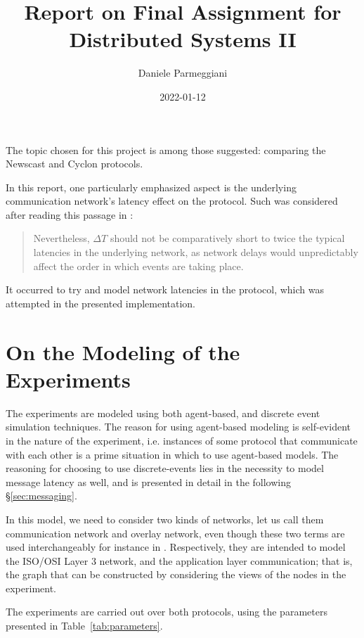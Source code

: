 \documentclass[a4paper]{ifacconf}
\newcommand{\DT}{\ensuremath{{\Delta}T}}
\begin{document}
\begin{frontmatter}
	\title{Report on Final Assignment for Distributed Systems II}
	\author{Daniele Parmeggiani}
	\date{2022-01-12}
\end{frontmatter}

The topic chosen for this project is among those suggested: comparing the Newscast and Cyclon protocols.

In this report, one particularly emphasized aspect is the underlying communication network's latency effect on the protocol.
Such was considered after reading this passage in \cite[\S3.2]{cyclon}:
\begin{quote}
    Nevertheless, $\DT$ should not be comparatively short to twice the typical latencies in the underlying network, as network delays would unpredictably affect the order in which events are taking place.
\end{quote}

It occurred to try and model network latencies in the protocol, which was attempted in the presented implementation.

\section{On the Modeling of the Experiments}

The experiments are modeled using both agent-based, and discrete event simulation techniques.
The reason for using agent-based modeling is self-evident in the nature of the experiment, i.e. instances of some protocol that communicate with each other is a prime situation in which to use agent-based models.
The reasoning for choosing to use discrete-events lies in the necessity to model message latency as well, and is presented in detail in the following \S\ref{sec:messaging}.

In this model, we need to consider two kinds of networks, let us call them communication network and overlay network, even though these two terms are used interchangeably for instance in \cite{newscast}.
Respectively, they are intended to model the ISO/OSI Layer 3 network, and the application layer communication; that is, the graph that can be constructed by considering the views of the nodes in the experiment.

The experiments are carried out over both protocols, using the parameters presented in Table~\ref{tab:parameters}.
\end{document}
